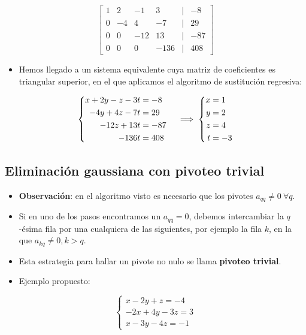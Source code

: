 \documentclass[openany]{book}
\providecommand{\tightlist}{%
  \setlength{\itemsep}{0pt}\setlength{\parskip}{0pt}}
\begin{document}
\[
\begin{bmatrix}
1 & 2 & -1 & 3 &|& -8\\
0 & -4 & 4 & -7 &|& 29\\
0 & 0 & -12 & 13 &|& -87\\
0 & 0 & 0 & -136 &|& 408  
\end{bmatrix}
\]

\begin{itemize}
\tightlist
\item
  Hemos llegado a un sistema equivalente cuya matriz de coeficientes es triangular superior, en el que aplicamos el algoritmo de sustitución regresiva:
\end{itemize}

\[
\left\{
\begin{aligned}
x+2y-z-3t &=-8 \cr
-4y+4z-7t &=29\cr
-12z+13t &=-87\cr
-136t &=408
\end{aligned}
\right.
\implies
\left\{
\begin{aligned}
x &= 1\\ y &= 2\\ z &= 4\\ t &= -3
\end{aligned}
\right.
\]

\hypertarget{eliminaciuxf3n-gaussiana-con-pivoteo-trivial}{%
\subsection{Eliminación gaussiana con pivoteo trivial}\label{eliminaciuxf3n-gaussiana-con-pivoteo-trivial}}

\begin{itemize}
\tightlist
\item
  \textbf{Observación}: en el algoritmo visto es necesario que los pivotes \(a_{qq} \neq 0 ~\forall q\).
\item
  Si en uno de los pasos encontramos un \(a_{qq} = 0\), debemos intercambiar la \(q\)-ésima fila por una cualquiera de las siguientes, por ejemplo la fila \(k\), en la que \(a_{kq} \neq 0, k>q\).
\item
  Esta estrategia para hallar un pivote no nulo se llama \textbf{pivoteo trivial}.
\item
  Ejemplo propuesto:
\end{itemize}

\[
\begin{cases} 
x-2y+z=-4 \\
-2x+4y-3z=3 \\
x-3y-4z=-1
\end{cases}
\]
\end{document}
